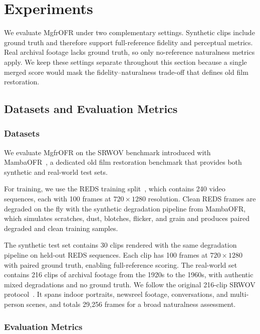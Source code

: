\documentclass[symmetry,article,submit,pdftex,moreauthors]{Definitions/mdpi}
\begin{document}
\section{Experiments}
\label{sec:experiment}

We evaluate MgfrOFR under two complementary settings. Synthetic clips include ground truth and therefore support full-reference fidelity and perceptual metrics. Real archival footage lacks ground truth, so only no-reference naturalness metrics apply. We keep these settings separate throughout this section because a single merged score would mask the fidelity--naturalness trade-off that defines old film restoration.

\subsection{Datasets and Evaluation Metrics}
\label{subsec:datasets_metrics}

\subsubsection{Datasets}
\label{subsec:datasets}

We evaluate MgfrOFR on the SRWOV benchmark introduced with MambaOFR~\cite{mao2025mambaofr}, a dedicated old film restoration benchmark that provides both synthetic and real-world test sets.

For training, we use the REDS training split~\cite{nah2019reds}, which contains 240 video sequences, each with 100 frames at $720 \times 1280$ resolution. Clean REDS frames are degraded on the fly with the synthetic degradation pipeline from MambaOFR, which simulates scratches, dust, blotches, flicker, and grain and produces paired degraded and clean training samples.

The synthetic test set contains 30 clips rendered with the same degradation pipeline on held-out REDS sequences. Each clip has 100 frames at $720 \times 1280$ with paired ground truth, enabling full-reference scoring. The real-world set contains 216 clips of archival footage from the 1920s to the 1960s, with authentic mixed degradations and no ground truth. We follow the original 216-clip SRWOV protocol~\cite{mao2025mambaofr}. It spans indoor portraits, newsreel footage, conversations, and multi-person scenes, and totals 29{,}256 frames for a broad naturalness assessment.

\subsubsection{Evaluation Metrics}
\label{subsec:eval_metrics}
\end{document}
